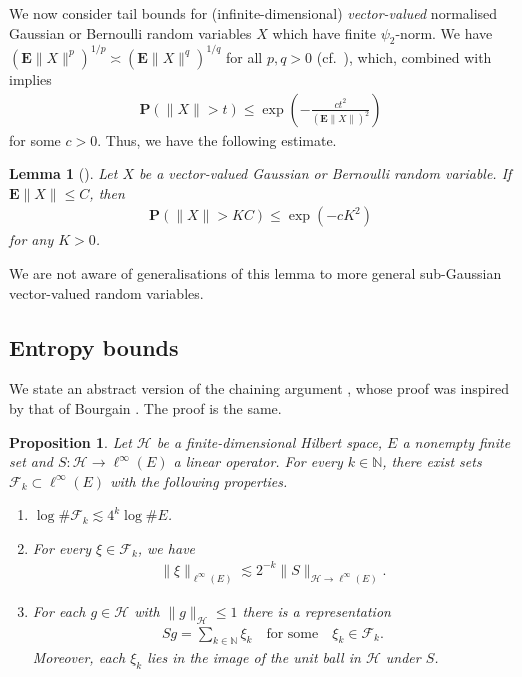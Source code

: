 \documentclass[12pt,reqno]{amsart}
\newtheorem{proposition}[theorem]{Proposition}
\newtheorem{lemma}[theorem]{Lemma}
\theoremstyle{definition}
\theoremstyle{remark}
\numberwithin{equation}{section}
\newcommand{\1}{\mathbbm{1}}
\newcommand{\N}{\mathbb{N}}
\begin{document}
\smallskip
We now consider tail bounds for (infinite-dimensional) \emph{vector-valued} normalised Gaussian or Bernoulli random variables $X$ which have finite $\psi_2$-norm. We have $(\mathbf{E}\|X\|^p)^{1/p}\asymp(\mathbf{E}\|X\|^q)^{1/q}$ for all $p,q>0$ (cf.~\cite[Corollary 3.2 and Theorem 4.7]{LedouxTalagrand1991}), which, combined with \cite[(3.5), (4.12)]{LedouxTalagrand1991} implies
\begin{align*}
  \mathbf{P}(\|X\| > t)
  \leq \exp\left(-\frac{ct^2}{(\mathbf{E}\|X\|)^2}\right)
\end{align*}
for some $c>0$. Thus, we have the following estimate.

\begin{lemma}[{\cite[Lemma~22]{CueninMerz2025}}]\label{lem:tailbound}
  Let $X$ be a vector-valued Gaussian or Bernoulli random variable.
  If $\mathbf{E}\|X\|\leq C$, then
  \begin{align}
    \mathbf{P}(\|X\| > KC)
    \leq \exp(-cK^2)
  \end{align}
 for any $K>0$.
\end{lemma}
We are not aware of generalisations of this lemma to more general sub-Gaussian vector-valued random variables.

\subsection{Entropy bounds}
We state an abstract version of the chaining argument \cite[Corollary~14]{CueninMerz2025}, whose proof was inspired by that of Bourgain \cite{Bourgain2002}. The proof is the same.

\begin{proposition}\label{prop. abstract chaining}
  \label{prop. representaion}
  Let $\mathcal{H}$ be a finite-dimensional Hilbert space, $E$ a nonempty finite set and
  $S:\mathcal{H}\to \ell^{\infty}(E)$ a linear operator.
  For every $k\in \N$, there exist sets $\mathcal{F}_k\subset \ell^{\infty}(E)$ with the following properties.
  \begin{enumerate}
  \item[\rm(a)] $\log\#\mathcal{F}_k\lesssim 4^k \log \# E$.

  \item[\rm(b)] For every $\xi\in \mathcal{F}_k$, we have
    \begin{align}
      \label{eq:boundxiinfty}
      \|\xi\|_{\ell^{\infty}(E)}\lesssim 2^{-k}\|S\|_{\mathcal{H}\to \ell^{\infty}(E)}.
    \end{align}
 

  \item[\rm(c)] For each $g\in \mathcal{H}$ with $\|g\|_{\mathcal{H}}\leq 1$ there is a representation
    \begin{align}
      Sg = \sum_{k\in \N}\xi_k\quad \text{for some}\quad \xi_k\in\mathcal{F}_k.
    \end{align} 
    Moreover, each $\xi_k$ lies in the image of the unit ball in $\mathcal{H}$ under $S$.
  \end{enumerate}
\end{proposition}
\end{document}
